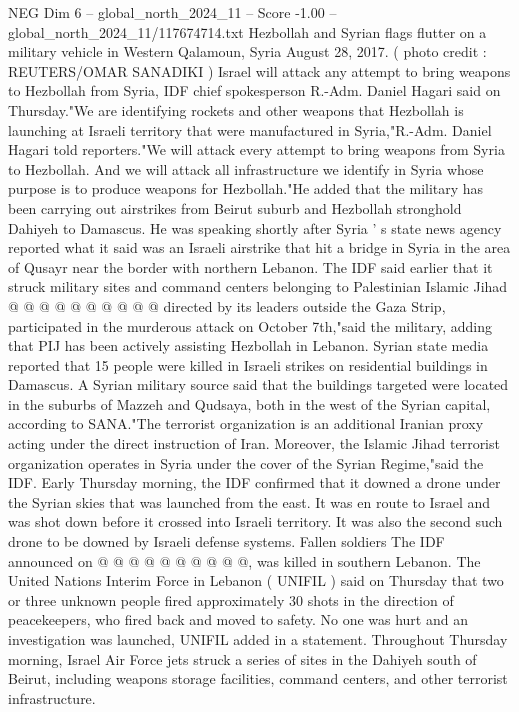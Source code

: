 \begin{textsample}{NEG Dim 6 – global\_north\_2024\_11 – Score -1.00 – global\_north\_2024\_11/117674714.txt}  \label{ex:f6_neg_160}
Hezbollah and Syrian flags flutter on a military vehicle in Western Qalamoun, Syria August 28, 2017. ( photo credit : REUTERS/OMAR SANADIKI ) Israel will attack any attempt to bring weapons to Hezbollah from Syria, IDF chief spokesperson R.-Adm.
Daniel Hagari said on Thursday."We are identifying rockets and other weapons that Hezbollah is launching at Israeli territory that were manufactured in Syria,"R.-Adm.
Daniel Hagari told reporters."We will attack every attempt to bring weapons from Syria to Hezbollah.
And we will attack all infrastructure we identify in Syria whose purpose is to produce weapons for Hezbollah."He added that the military has been carrying out airstrikes from Beirut suburb and Hezbollah stronghold Dahiyeh to Damascus.
He was speaking shortly after Syria ' s state news agency reported what it said was an Israeli airstrike that hit a bridge in Syria in the area of Qusayr near the border with northern Lebanon.
The IDF said earlier that it struck military sites and command centers belonging to Palestinian Islamic Jihad @ @ @ @ @ @ @ @ @ @ directed by its leaders outside the Gaza Strip, participated in the murderous attack on October 7th,"said the military, adding that PIJ has been actively assisting Hezbollah in Lebanon.
Syrian state media reported that 15 people were killed in Israeli strikes on residential buildings in Damascus.
A Syrian military source said that the buildings targeted were located in the suburbs of Mazzeh and Qudsaya, both in the west of the Syrian capital, according to SANA."The terrorist organization is an additional Iranian proxy acting under the direct instruction of Iran.
Moreover, the Islamic Jihad terrorist organization operates in Syria under the cover of the Syrian Regime,"said the IDF.
Early Thursday morning, the IDF confirmed that it downed a drone under the Syrian skies that was launched from the east.
It was en route to Israel and was shot down before it crossed into Israeli territory.
It was also the second such drone to be downed by Israeli defense systems.
Fallen soldiers The IDF announced on @ @ @ @ @ @ @ @ @ @, was killed in southern Lebanon.
The United Nations Interim Force in Lebanon ( UNIFIL ) said on Thursday that two or three unknown people fired approximately 30 shots in the direction of peacekeepers, who fired back and moved to safety.
No one was hurt and an investigation was launched, UNIFIL added in a statement.
Throughout Thursday morning, Israel Air Force jets struck a series of sites in the Dahiyeh south of Beirut, including weapons storage facilities, command centers, and other terrorist infrastructure.

\end{textsample}
